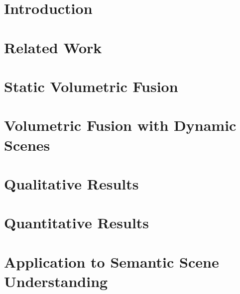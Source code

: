 
\section{Introduction}

\section{Related Work}

\section{Static Volumetric Fusion}

\section{Volumetric Fusion with Dynamic Scenes}

\section{Qualitative Results}

\section{Quantitative Results}

\section{Application to Semantic Scene Understanding}